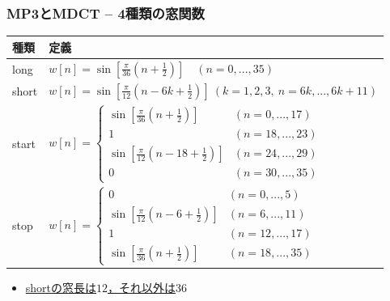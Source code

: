 \documentclass[14pt,xcolor=dvipsnames,table,dvipdfmx]{beamer}
\begin{document}
\begin{frame}[c]
    \frametitle{MP3とMDCT -- 4種類の窓関数}
    \footnotesize
    \begin{table}[H]
        \begin{tabular}{|l|l|}
            \toprule
            種類 & 定義 \\
            \midrule
            long  & $\displaystyle w[n] = \sin\left[ \frac{\pi}{36} \left( n + \frac{1}{2} \right) \right] \quad (n = 0, ..., 35)$ \\[3ex]
            short & $\displaystyle w[n] = \sin\left[ \frac{\pi}{12} \left( n - 6k + \frac{1}{2} \right) \right] \ (k = 1,2,3,\ n = 6k, ..., 6k+11)$ \\[3ex]
            start & $\displaystyle w[n] =
            \left\{ \begin{array}{ll}
                \sin\left[ \frac{\pi}{36} \left( n + \frac{1}{2} \right) \right] & (n = 0, ..., 17) \\
                1 & (n = 18, ..., 23) \\
                \sin\left[ \frac{\pi}{12} \left( n - 18 + \frac{1}{2} \right) \right] & (n = 24, ..., 29) \\
                0 & (n = 30, ..., 35)
            \end{array}\right.$ \\[5ex]
            stop & $\displaystyle w[n] =
            \left\{ \begin{array}{ll}
                0 & (n = 0, ..., 5) \\
                \sin\left[ \frac{\pi}{12} \left( n - 6 + \frac{1}{2} \right) \right] & (n = 6, ..., 11) \\
                1 & (n = 12, ..., 17) \\
                \sin\left[ \frac{\pi}{36} \left( n + \frac{1}{2} \right) \right] & (n = 18, ..., 35)
            \end{array}\right.$ \\[5ex] \hline
        \end{tabular}
    \end{table}
    \normalsize
    \begin{itemize}
        \item \underline{shortの窓長は$12$，それ以外は$36$}
    \end{itemize}
\end{frame}
\end{document}
